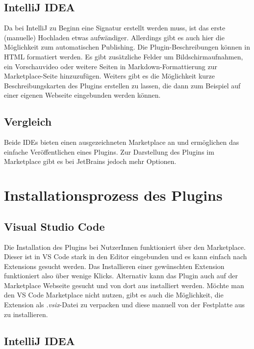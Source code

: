 \subsection{IntelliJ IDEA}

Da bei IntelliJ zu Beginn eine Signatur erstellt werden muss, ist das
erste (manuelle) Hochladen etwas aufwändiger. Allerdings
gibt es auch hier die Möglichkeit zum automatischen Publishing.
Die Plugin-Beschreibungen können in HTML formatiert werden. Es gibt
zusätzliche Felder um Bildschirmaufnahmen, ein Vorschauvideo oder
weitere Seiten in Markdown-Formattierung zur Marketplace-Seite
hinzuzufügen. Weiters gibt es die Möglichkeit kurze Beschreibungskarten
des Plugins erstellen zu lassen, die dann zum Beispiel auf 
einer eigenen Webseite eingebunden werden können.

\subsection{Vergleich}

Beide IDEs bieten einen ausgezeichneten Marketplace an
und ermöglichen das einfache Veröffentlichen eines Plugins.
Zur Darstellung des Plugins im Marketplace gibt es bei JetBrains
jedoch mehr Optionen.


\section{Installationsprozess des Plugins}
\label{sec:Vergleich_Installationsprozess}

\subsection{Visual Studio Code}

Die Installation des Plugins bei NutzerInnen funktioniert
über den Marketplace. Dieser ist in VS Code stark in den 
Editor eingebunden und es kann einfach nach 
Extensions gesucht werden. Das Installieren einer gewünschten
Extension funktioniert also über wenige Klicks.
Alternativ kann das Plugin auch auf der Marketplace Webseite
gesucht und von dort aus installiert werden.
Möchte man den VS Code Marketplace nicht nutzen, gibt es auch
die Möglichkeit, die Extension als \emph{.vsix}-Datei
zu verpacken und diese manuell von der Festplatte aus zu installieren.

\subsection{IntelliJ IDEA}

